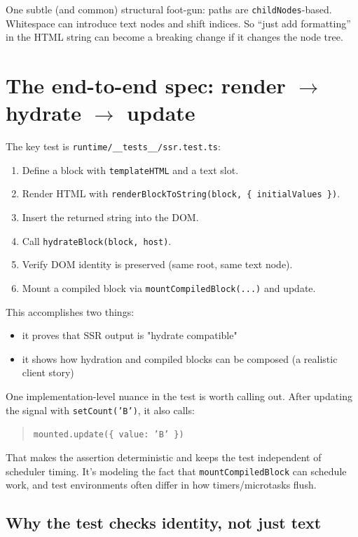 One subtle (and common) structural foot-gun: paths are \texttt{childNodes}-based.
Whitespace can introduce text nodes and shift indices.
So “just add formatting” in the HTML string can become a breaking change if it changes the node tree.

\section{The end-to-end spec: render \(\rightarrow\) hydrate \(\rightarrow\) update}

The key test is \texttt{runtime/\_\_tests\_\_/ssr.test.ts}:

\begin{enumerate}
  \item Define a block with \texttt{templateHTML} and a text slot.
  \item Render HTML with \texttt{renderBlockToString(block, \{ initialValues \})}.
  \item Insert the returned string into the DOM.
  \item Call \texttt{hydrateBlock(block, host)}.
  \item Verify DOM identity is preserved (same root, same text node).
  \item Mount a compiled block via \texttt{mountCompiledBlock(...)} and update.
\end{enumerate}

This accomplishes two things:

\begin{itemize}
  \item it proves that SSR output is "hydrate compatible"
  \item it shows how hydration and compiled blocks can be composed (a realistic client story)
\end{itemize}

One implementation-level nuance in the test is worth calling out.
After updating the signal with \texttt{setCount('B')}, it also calls:

\begin{quote}
	\texttt{mounted.update(\{ value: 'B' \})}
\end{quote}

That makes the assertion deterministic and keeps the test independent of scheduler timing.
It’s modeling the fact that \texttt{mountCompiledBlock} can schedule work, and test environments often differ in how timers/microtasks flush.

\subsection{Why the test checks identity, not just text}

